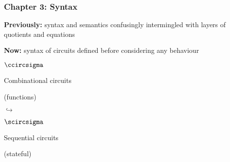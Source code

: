 \begin{frame}
    \frametitle{Chapter 3: Syntax}

    \textbf{Previously:} syntax and semantics confusingly intermingled with
    layers of quotients and equations

    \pause

    \textbf{Now:} syntax of circuits defined before considering any behaviour

    \pause

    \vspace{1em}

    \begin{center}
        \begin{minipage}{0.4\textwidth}
            \centering
            {\LARGE\(\ccircsigma\)}

            \vspace{1em}

            \alert{Combinational} circuits

            (functions)
        \end{minipage}
        \pause
        {\LARGE\(\hookrightarrow\)}
        \begin{minipage}{0.4\textwidth}
            \centering
            {\LARGE\(\scircsigma\)}

            \vspace{1em}

            \alert{Sequential} circuits

            (stateful)
        \end{minipage}
    \end{center}

\end{frame}

